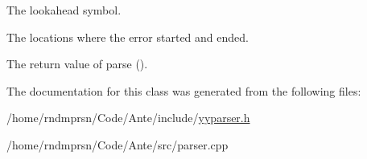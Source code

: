 The lookahead symbol.

The locations where the error started and ended.

The return value of parse (). 

The documentation for this class was generated from the following files\+:\begin{DoxyCompactItemize}
\item 
/home/rndmprsn/\+Code/\+Ante/include/\hyperlink{yyparser_8h}{yyparser.\+h}\item 
/home/rndmprsn/\+Code/\+Ante/src/parser.\+cpp\end{DoxyCompactItemize}
